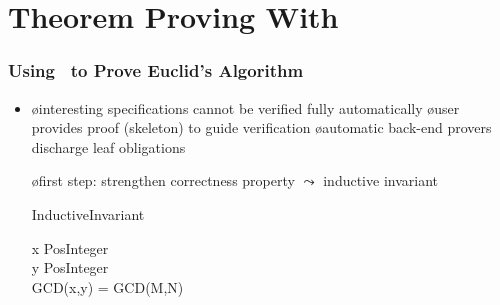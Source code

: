 \documentclass[fleqn]{beamer}
\begin{document}
\section{Theorem Proving With \tlaps}

\begin{frame}
  \frametitle{Using \tlaps\ to Prove Euclid's Algorithm}

  \begin{itemize}
  \item {}

  \oo {}

    \begin{itemize}
    \o interesting specifications cannot be verified fully automatically
    \o user provides proof (skeleton) to guide verification
    \o automatic back-end provers discharge leaf obligations
    \end{itemize}

\pause

  \oo {}

    \begin{itemize}
    \o first step: strengthen correctness property $\leadsto$ \alert{inductive invariant}

       \medskip
       \begin{tlablock}[.7]
         InductiveInvariant\ \deq\ 
         \begin{conj}
           x \in PosInteger\\
           y \in PosInteger\\
           GCD(x,y) = GCD(M,N)
         \end{conj}
       \end{tlablock}
    \end{itemize}
  \end{itemize}
\end{frame}
\end{document}
